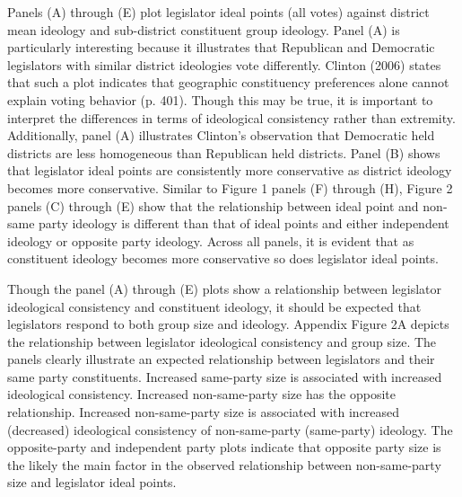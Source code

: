 \documentclass[10pt,letterpaper]{article}
\begin{document}
Panels (A) through (E) plot legislator ideal points (all votes) against district mean ideology and sub-district constituent group ideology. Panel (A) is particularly interesting because it illustrates that Republican and Democratic legislators with similar district ideologies vote differently. Clinton (2006) states that such a plot indicates that geographic constituency preferences alone cannot explain voting behavior (p. 401). Though this may be true, it is important to interpret the differences in terms of ideological consistency rather than extremity. Additionally, panel (A) illustrates Clinton's observation that Democratic held districts are less homogeneous than Republican held districts. Panel (B) shows that legislator ideal points are consistently more conservative as district ideology becomes more conservative. Similar to Figure 1 panels (F) through (H), Figure 2 panels (C) through (E) show that the relationship between ideal point and non-same party ideology is different than that of ideal points and either independent ideology or opposite party ideology. Across all panels, it is evident that as constituent ideology becomes more conservative so does legislator ideal points.

Though the panel (A) through (E) plots show a relationship between legislator ideological consistency and constituent ideology, it should be expected that legislators respond to both group size and ideology. Appendix Figure 2A depicts the relationship between legislator ideological consistency and group size. The panels clearly illustrate an expected relationship between legislators and their same party constituents. Increased same-party size is associated with increased ideological consistency. Increased non-same-party size has the opposite relationship. Increased non-same-party size is associated with increased (decreased) ideological consistency of non-same-party (same-party) ideology. The opposite-party and independent party plots indicate that opposite party size is the likely the main factor in the observed relationship between non-same-party size and legislator ideal points.
\end{document}
